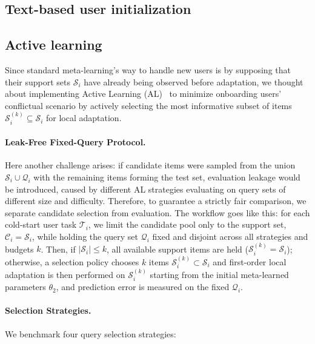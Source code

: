 \documentclass[10pt,twocolumn,letterpaper]{article}
\begin{document}
\subsection{Text-based user initialization}
\label{sec:method_init}

\subsection{Active learning}
\label{sec:method_al}

Since standard meta-learning’s way to handle new users is by supposing that their support sets $\mathcal{S}_i$ have already being observed before adaptation, we thought about implementing Active Learning (AL)~\cite{settles2009active} to minimize onboarding users' conflictual scenario by actively selecting the most informative subset of items $\mathcal{S}_i^{(k)} \subseteq \mathcal{S}_i$ for local adaptation.

\paragraph{Leak-Free Fixed-Query Protocol.}
Here another challenge arises: if candidate items were sampled from the union $\mathcal{S}_i \cup \mathcal{Q}_i$ with the remaining items forming the test set, evaluation leakage would be introduced, caused by different AL strategies evaluating on query sets of different size and difficulty. Therefore, to guarantee a strictly fair comparison, we separate candidate selection from evaluation. The workflow goes like this: for each cold-start user task $\mathcal{T}_i$, we limit the candidate pool only to the support set, $\mathcal{C}_i = \mathcal{S}_i$, while holding the query set $\mathcal{Q}_i$ fixed and disjoint across all strategies and budgets $k$. Then, if $|\mathcal{S}_i| \le k$, all available support items are held ($\mathcal{S}_i^{(k)} = \mathcal{S}_i$); otherwise, a selection policy chooses $k$ items $\mathcal{S}_i^{(k)} \subset \mathcal{S}_i$ and first-order local adaptation is then performed on $\mathcal{S}_i^{(k)}$ starting from the initial meta-learned parameters $\theta_2$, and prediction error is measured on the fixed $\mathcal{Q}_i$.

\paragraph{Selection Strategies.}
We benchmark four query selection strategies:
\end{document}
